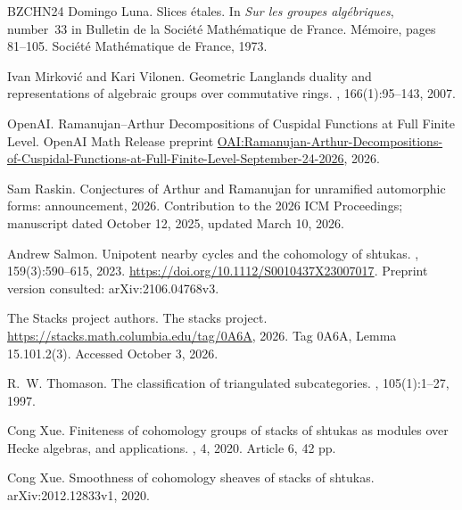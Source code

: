 \documentclass[11pt]{article}
\numberwithin{equation}{section}
\theoremstyle{definition}
\theoremstyle{remark}
\begin{document}
\begin{thebibliography}{BZCHN24}
Domingo Luna.
\newblock Slices \'etales.
\newblock In {\em Sur les groupes alg\'ebriques}, number~33 in Bulletin de la
  Soci\'et\'e Math\'ematique de France. M\'emoire, pages 81--105. Soci\'et\'e
  Math\'ematique de France, 1973.

Ivan Mirkovi{\'c} and Kari Vilonen.
\newblock Geometric {Langlands} duality and representations of algebraic groups
  over commutative rings.
, 166(1):95--143, 2007.

OpenAI.
\newblock Ramanujan--Arthur Decompositions of Cuspidal Functions at Full Finite Level.
\newblock OpenAI Math Release preprint
\href{https://github.com/openai/math/blob/main/preprints/Ramanujan-Arthur-Decompositions-of-Cuspidal-Functions-at-Full-Finite-Level-September-24-2026/paper.pdf}{OAI:Ramanujan-Arthur-Decompositions-of-Cuspidal-Functions-at-Full-Finite-Level-September-24-2026}, 2026.

Sam Raskin.
\newblock Conjectures of {Arthur} and {Ramanujan} for unramified automorphic
  forms: announcement, 2026.
\newblock Contribution to the 2026 ICM Proceedings; manuscript dated October
  12, 2025, updated March 10, 2026.

Andrew Salmon.
\newblock Unipotent nearby cycles and the cohomology of shtukas.
, 159(3):590--615, 2023.
\newblock \url{https://doi.org/10.1112/S0010437X23007017}.
\newblock Preprint version consulted: arXiv:2106.04768v3.

{The Stacks project authors}.
\newblock The stacks project.
\newblock \url{https://stacks.math.columbia.edu/tag/0A6A}, 2026.
\newblock Tag 0A6A, Lemma 15.101.2(3). Accessed October 3, 2026.

R.~W. Thomason.
\newblock The classification of triangulated subcategories.
, 105(1):1--27, 1997.

Cong Xue.
\newblock Finiteness of cohomology groups of stacks of shtukas as modules over
  {Hecke} algebras, and applications.
, 4, 2020.
\newblock Article 6, 42 pp.

Cong Xue.
\newblock Smoothness of cohomology sheaves of stacks of shtukas.
\newblock arXiv:\allowbreak 2012.12833v1, 2020.

\end{thebibliography}
\end{document}
